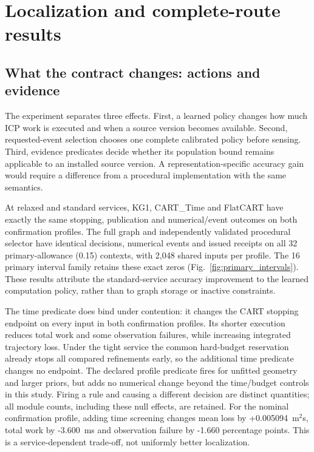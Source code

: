 \section{Localization and complete-route results}\label{sec:evaluation}
\subsection{What the contract changes: actions and evidence}
The experiment separates three effects. First, a learned policy changes how much ICP work is executed and when a source version becomes available. Second, requested-event selection chooses one complete calibrated policy before sensing. Third, evidence predicates decide whether its population bound remains applicable to an installed source version. A representation-specific accuracy gain would require a difference from a procedural implementation with the same semantics.

At relaxed and standard services, KG1, CART\_Time and FlatCART have exactly the same stopping, publication and numerical/event outcomes on both confirmation profiles. The full graph and independently validated procedural selector have identical decisions, numerical events and issued receipts on all 32 primary-allowance (0.15) contexts, with 2,048 shared inputs per profile. The 16 primary interval family retains these exact zeros (Fig.~\ref{fig:primary_intervals}). These results attribute the standard-service accuracy improvement to the learned computation policy, rather than to graph storage or inactive constraints.

The time predicate does bind under contention: it changes the CART stopping endpoint on every input in both confirmation profiles. Its shorter execution reduces total work and some observation failures, while increasing integrated trajectory loss. Under the tight service the common hard-budget reservation already stops all compared refinements early, so the additional time predicate changes no endpoint. The declared profile predicate fires for unfitted geometry and larger priors, but adds no numerical change beyond the time/budget controls in this study. Firing a rule and causing a different decision are distinct quantities; all module counts, including these null effects, are retained.
For the nominal confirmation profile, adding time screening changes mean loss by +0.005094~m$^2$s, total work by -3.600~ms and observation failure by -1.660 percentage points. This is a service-dependent trade-off, not uniformly better localization.

